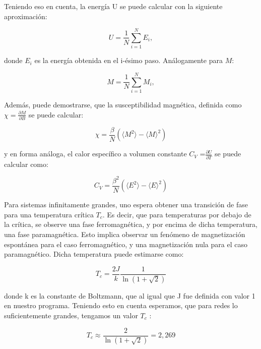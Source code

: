 \documentclass[twocolumn,Spanish,a4paper,11pt]{article}
\begin{document}
Teniendo eso en cuenta, la energía U se puede calcular
con la siguiente aproximación:

\begin{equation}
U=\frac{1}{N}\sum_{i=1}^{N}{E_i},
\label{emedia}
\end{equation}

donde $E_i$ es la energía obtenida en el i-ésimo paso.
Análogamente para $M$:

\begin{equation}
M=\frac{1}{N}\sum_{i=1}^{N}{M_i},
\label{mmedia}
\end{equation}

Además, puede demostrarse, que la susceptibilidad
magnética, definida como $\chi =\frac{\partial{M}}{\partial{B}}$  se puede calcular:

\begin{equation}
\chi=\dfrac{\beta}{N} \left( \langle M^2 \rangle - \langle M \rangle ^2 \right)
\label{ec:susc}
\end{equation}

y en forma análoga, el calor específico a volumen
constante $C_V$ =$\frac{\partial{U}}{\partial{T}}$ se puede calcular como:

\begin{equation}
C_V = \dfrac{\beta ^2}{N} \left( \langle E^2 \rangle -\langle E \rangle ^2 \right)
\label{ec:calor}
\end{equation}

Para sistemas infinitamente grandes, uno espera obtener una transición de fase para
una temperatura crítica $T_c$. Es decir, que para
temperaturas por debajo de la crítica, se observe una
fase ferromagnética, y por encima de dicha temperatura,
una fase paramagnética. Esto implica observar un
fenómeno de magnetización espontánea para el caso
ferromagnético, y una magnetización nula para el caso
paramagnético. Dicha temperatura puede estimarse
como:

\begin{equation}
T_c=\frac{2J}{k}\frac{1}{\ln\left(1+\sqrt{2}\right)}
\label{ec:tc1}
\end{equation}

donde k es la constante de Boltzmann, que al igual que
J fue definida con valor 1 en nuestro programa. Teniendo
esto en cuenta esperamos, que para redes lo suficientemente grandes, tengamos un valor $T_c$ :

\begin{equation}
T_c\approx\frac{2}{\ln\left(1+\sqrt{2}\right)}=2,269
\label{ec:tc}
\end{equation}
\end{document}
